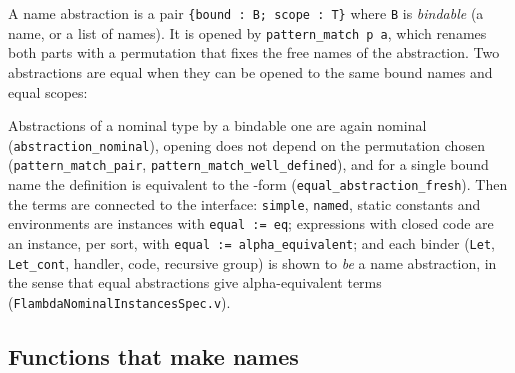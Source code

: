 \documentclass[10pt,a4paper]{article}
\newcommand\code[1]{\texttt{#1}}
\newcommand\file[1]{\texttt{\color{soft}#1}}
\begin{document}
A name abstraction is a pair \code{\{bound : B; scope : T\}} where \code{B} is
\emph{bindable} (a name, or a list of names). It is opened by
\code{pattern\_match p a}, which renames both parts with a permutation that
fixes the free names of the abstraction. Two abstractions are equal when they
can be opened to the same bound names and equal scopes:

\begin{center}
\end{center}

Abstractions of a nominal type by a bindable one are again nominal
(\code{abstraction\_nominal}), opening does not depend on the permutation
chosen (\code{pattern\_match\_pair}, \code{pattern\_match\_well\_defined}), and
for a single bound name the definition is equivalent to the
-form (\code{equal\_abstraction\_fresh}).
Then the terms are connected to the interface: \code{simple}, \code{named},
static constants and environments are instances with \code{equal := eq};
expressions with closed code are an instance, per sort, with \code{equal :=
alpha\_equivalent}; and each binder (\code{Let}, \code{Let\_cont}, handler,
code, recursive group) is shown to \emph{be} a name abstraction, in the sense
that equal abstractions give alpha-equivalent terms
(\file{FlambdaNominalInstancesSpec.v}).

\subsection{Functions that make names}
\end{document}
